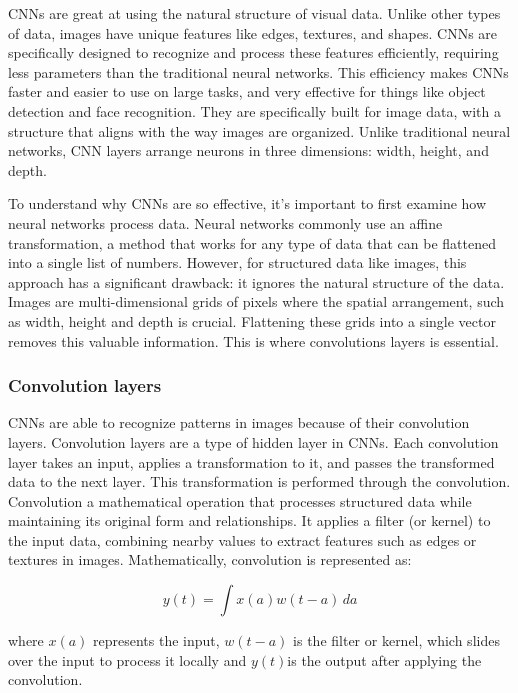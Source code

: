 CNNs are great at using the natural structure of visual data. Unlike other types of data, images have unique features like edges, textures, and shapes. CNNs are specifically designed to recognize and process these features efficiently, requiring less parameters than the traditional neural networks. This efficiency makes CNNs faster and easier to use on large tasks, and very effective for things like object detection and face recognition. They are specifically built for image data, with a structure that aligns with the way images are organized. Unlike traditional neural networks, CNN layers arrange neurons in three dimensions: width, height, and depth.

To understand why CNNs are so effective, it's important to first examine how neural networks process data. Neural networks commonly use an affine transformation, a method that works for any type of data that can be flattened into a single list of numbers. However, for structured data like images, this approach has a significant drawback: it ignores the natural structure of the data. Images are multi-dimensional grids of pixels where the spatial arrangement, such as width, height and depth is crucial. Flattening these grids into a single vector removes this valuable information. This is where convolutions layers is essential.

\subsubsection{ Convolution layers}

CNNs are able to recognize patterns in images because of their convolution layers. Convolution layers are a type of hidden layer in CNNs. Each convolution layer takes an input, applies a transformation to it, and passes the transformed data to the next layer. This transformation is performed through the convolution.
Convolution a mathematical operation that processes structured data while maintaining its original form and relationships. It applies a filter (or kernel) to the input data, combining nearby values to extract features such as edges or textures in images. Mathematically, convolution is represented as:

\begin{equation}
    y(t) = \int x(a)w(t-a) \, da
\end{equation}

where \( x(a) \) represents the input,  \( w(t-a) \) is the filter or kernel, which slides over the input to process it locally and \( y(t) \)is the output after applying the convolution.

